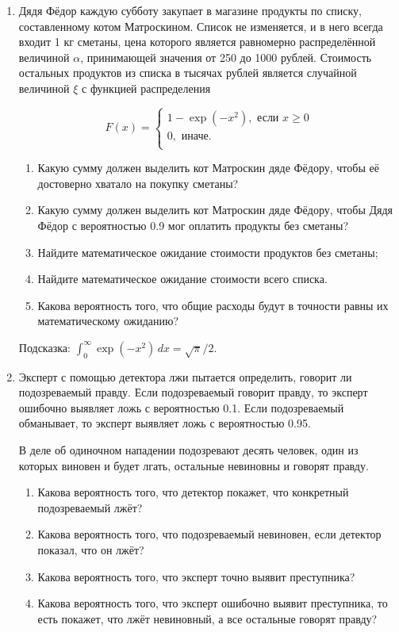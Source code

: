 \begin{enumerate}
\item Дядя Фёдор каждую субботу закупает в магазине продукты по списку, составленному котом Матроскином. Список не изменяется, и в него всегда входит 1 кг сметаны, цена которого является равномерно распределённой величиной $\alpha$, принимающей значения от 250 до 1000 рублей. Стоимость остальных продуктов из списка в тысячах рублей является случайной величиной $\xi$ с функцией распределения

\[
F(x)=\begin{cases}
1-\exp(-x^2 ), \text{ если } x \geq 0 \\
0, \text{ иначе.}\\
\end{cases}
\]

\begin{enumerate}
\item Какую сумму должен выделить кот Матроскин дяде Фёдору, чтобы её достоверно хватало на покупку сметаны?
\item Какую сумму должен выделить кот Матроскин дяде Фёдору, чтобы Дядя Фёдор с вероятностью 0.9 мог оплатить продукты без сметаны?
\item Найдите математическое ожидание стоимости продуктов без сметаны;
\item Найдите математическое ожидание стоимости всего списка.
\item Какова вероятность того, что общие расходы будут в точности равны их математическому ожиданию?
\end{enumerate}

Подсказка: $\int_0^{\infty} \exp(-x^2) \, dx = \sqrt{\pi} / 2$.

\item Эксперт с помощью детектора лжи пытается определить, говорит ли подозреваемый правду. Если подозреваемый говорит правду, то эксперт ошибочно выявляет ложь с вероятностью 0.1. Если подозреваемый обманывает, то эксперт выявляет ложь с вероятностью 0.95.

В деле об одиночном нападении подозревают десять человек, один из которых виновен и будет лгать, остальные невиновны и говорят правду.

\begin{enumerate}
\item Какова вероятность того, что детектор покажет, что конкретный подозреваемый лжёт?
\item Какова вероятность того, что подозреваемый невиновен, если детектор показал, что он лжёт?
\item Какова вероятность того, что эксперт точно выявит преступника?
\item Какова вероятность того, что эксперт ошибочно выявит  преступника, то есть покажет, что лжёт невиновный, а все остальные говорят правду?
\end{enumerate}



\end{enumerate}



